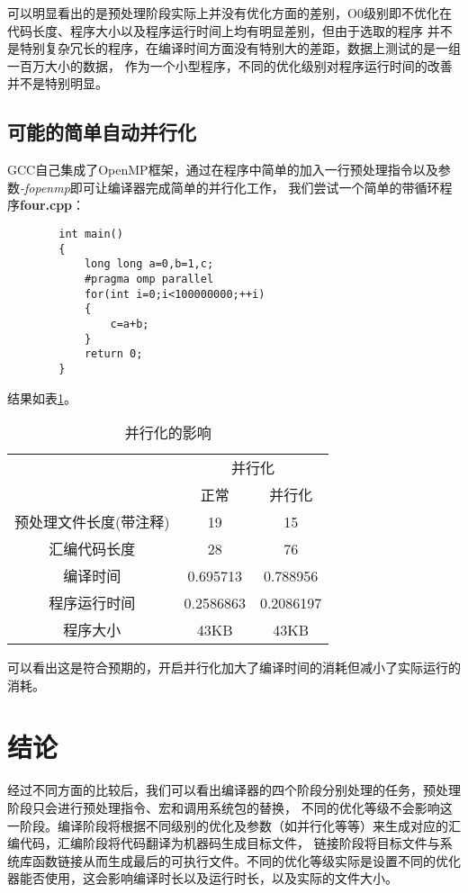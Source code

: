 \documentclass[UTF8]{ctexart}
\begin{document}
    可以明显看出的是预处理阶段实际上并没有优化方面的差别，O0级别即不优化在代码长度、程序大小以及程序运行时间上均有明显差别，但由于选取的程序
    并不是特别复杂冗长的程序，在编译时间方面没有特别大的差距，数据上测试的是一组一百万大小的数据，
    作为一个小型程序，不同的优化级别对程序运行时间的改善并不是特别明显。
    \subsection{可能的简单自动并行化}
    GCC自己集成了OpenMP框架，通过在程序中简单的加入一行预处理指令以及参数\emph{-fopenmp}即可让编译器完成简单的并行化工作，
    我们尝试一个简单的带循环程序\textbf{four.cpp}：
    \begin{verbatim}
        int main()
        {
            long long a=0,b=1,c;
            #pragma omp parallel
            for(int i=0;i<100000000;++i)
            {
                c=a+b;
            }
            return 0;
        }
    \end{verbatim}
    结果如表\ref{parallel_list}。
    \begin{table}[h]
        \centering
        \begin{tabular}{ccc}
            \toprule
            & \multicolumn{2}{c}{并行化} \\
            \cmidrule{2-3}
            & 正常 & 并行化 \\
            \midrule
            预处理文件长度(带注释) & 19 & 15  \\
            汇编代码长度 & 28 & 76  \\
            编译时间 & 0.695713 & 0.788956 \\
            程序运行时间 & 0.2586863 & 0.2086197  \\
            程序大小 & 43KB & 43KB  \\
            \bottomrule
        \end{tabular} 
        \caption{并行化的影响}\label{parallel_list}
    \end{table}

    可以看出这是符合预期的，开启并行化加大了编译时间的消耗但减小了实际运行的消耗。
    \section{结论}
    经过不同方面的比较后，我们可以看出编译器的四个阶段分别处理的任务，预处理阶段只会进行预处理指令、宏和调用系统包的替换，
    不同的优化等级不会影响这一阶段。编译阶段将根据不同级别的优化及参数（如并行化等等）来生成对应的汇编代码，汇编阶段将代码翻译为机器码生成目标文件，
    链接阶段将目标文件与系统库函数链接从而生成最后的可执行文件。不同的优化等级实际是设置不同的优化器能否使用，这会影响编译时长以及运行时长，以及实际的文件大小。
\end{document}
